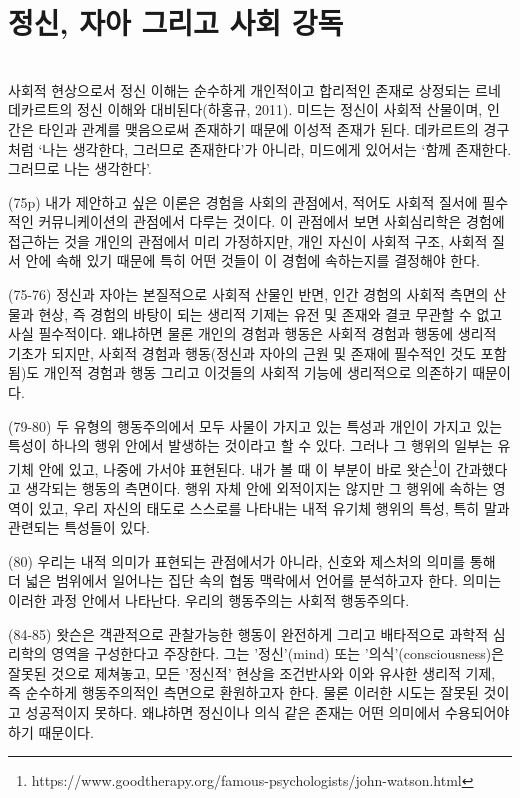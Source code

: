 \documentclass[12pt, a4paper]{article}
\begin{document}
\newpage

\section{정신, 자아 그리고 사회 강독} \\
사회적 현상으로서 정신 이해는 순수하게 개인적이고 합리적인 존재로 상정되는 르네 데카르트의 정신 이해와 대비된다(하홍규, 2011). 미드는 정신이 사회적 산물이며, 인간은 타인과 관계를 맺음으로써 존재하기 때문에 이성적 존재가 된다. 데카르트의 경구처럼 `나는 생각한다, 그러므로 존재한다'가 아니라, 미드에게 있어서는 `함께 존재한다. 그러므로 나는 생각한다'.

(75p) 내가 제안하고 싶은 이론은 경험을 사회의 관점에서, 적어도 사회적 질서에 필수적인 커뮤니케이션의 관점에서 다루는 것이다. 이 관점에서 보면 사회심리학은 경험에 접근하는 것을 개인의 관점에서 미리 가정하지만, 개인 자신이 사회적 구조, 사회적 질서 안에 속해 있기 때문에 특히 어떤 것들이 이 경험에 속하는지를 결정해야 한다.

(75-76) 정신과 자아는 본질적으로 사회적 산물인 반면, 인간 경험의 사회적 측면의 산물과 현상, 즉 경험의 바탕이 되는 생리적 기제는 유전 및 존재와 결코 무관할 수 없고 사실 필수적이다. 왜냐하면 물론 개인의 경험과 행동은 사회적 경험과 행동에 생리적 기초가 되지만, 사회적 경험과 행동(정신과 자아의 근원 및 존재에 필수적인 것도 포함됨)도 개인적 경험과 행동 그리고 이것들의 사회적 기능에 생리적으로 의존하기 때문이다.

(79-80) 두 유형의 행동주의에서 모두 사물이 가지고 있는 특성과 개인이 가지고 있는 특성이 하나의 행위 안에서 발생하는 것이라고 할 수 있다. 그러나 그 행위의 일부는 유기체 안에 있고, 나중에 가서야 표현된다. 내가 볼 때 이 부분이 바로 왓슨\footnote{https://www.goodtherapy.org/famous-psychologists/john-watson.html}이 간과했다고 생각되는 행동의 측면이다. 행위 자체 안에 외적이지는 않지만 그 행위에 속하는 영역이 있고, 우리 자신의 태도로 스스로를 나타내는 내적 유기체 행위의 특성, 특히 말과 관련되는 특성들이 있다.

(80) 우리는 내적 의미가 표현되는 관점에서가 아니라, 신호와 제스처의 의미를 통해 더 넓은 범위에서 일어나는 집단 속의 협동 맥락에서 언어를 분석하고자 한다. 의미는 이러한 과정 안에서 나타난다. 우리의 행동주의는 사회적 행동주의다.

(84-85) 왓슨은 객관적으로 관찰가능한 행동이 완전하게 그리고 배타적으로 과학적 심리학의 영역을 구성한다고 주장한다. 그는 '정신'(mind) 또는 '의식'(consciousness)은 잘못된 것으로 제쳐놓고, 모든 '정신적' 현상을 조건반사와 이와 유사한 생리적 기제, 즉 순수하게 행동주의적인 측면으로 환원하고자 한다. 물론 이러한 시도는 잘못된 것이고 성공적이지 못하다. 왜냐하면 정신이나 의식 같은 존재는 어떤 의미에서 수용되어야 하기 때문이다.
\end{document}
